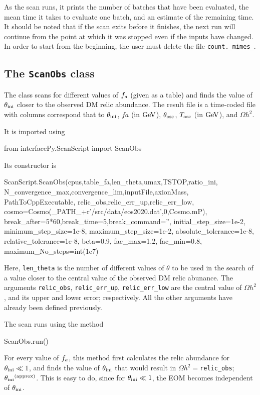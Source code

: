\documentclass[11pt,a4paper]{article}
\begin{document}
As the scan runs, it prints the number of batches that have been evaluated, the mean time it takes to evaluate one batch, and an estimate of the remaining time. It should be noted that if the scan exits before it finishes, the next run will continue from the point at which it was stopped even if the inputs have changed. In order to start from the beginning, the user must delete the file {\tt count.\_mimes\_}.

\subsection{The {\tt ScanObs} class}\label{app:ScanObs}
%
The  class scans for different values of $f_{a}{}$ (given as a table) and finds the value of $\theta_{\rm ini}{}$ closer to the observed DM relic abundance. The result file is a time-coded file with columns correspond that to $\theta_{\rm ini}{}$,  $fa$ (in ${\rm GeV}$), $\theta_{\rm osc}{}$, $T_{\rm osc}{}$ (in ${\rm GeV}$), and $\Omega h^2$. 

It is imported using 
%
\begin{py}
	from interfacePy.ScanScript import ScanObs
\end{py}

Its constructor is
%
\begin{py}
	ScanScript.ScanObs(cpus,table_fa,len_theta,umax,TSTOP,ratio_ini,
					N_convergence_max,convergence_lim,inputFile,axionMass,
					PathToCppExecutable, relic_obs,relic_err_up,relic_err_low,
					cosmo=Cosmo(_PATH_+r'/src/data/eos2020.dat',0,Cosmo.mP),
					break_after=5*60,break_time=5,break_command='',
					initial_step_size=1e-2, minimum_step_size=1e-8, maximum_step_size=1e-2, 
					absolute_tolerance=1e-8, relative_tolerance=1e-8,
					beta=0.9, fac_max=1.2, fac_min=0.8, maximum_No_steps=int(1e7)
\end{py}
%
Here, {\tt len\_theta} is the number of different values of $\theta$ to be used in the search of a value closer to the central value of the observed DM relic abunance. The arguments {\tt relic\_obs}, {\tt relic\_err\_up}, {\tt relic\_err\_low} are the central value of $\Omega h^2$, and its upper and lower error; respectively. All the other arguments have already been defined previously.  

The scan runs using the method
%
\begin{py}
	ScanObs.run()
\end{py} 
%
For every value of $f_{a}{}$, this method first calculates the relic abundance for $\theta_{\rm ini}{} \ll 1$, and finds the value of $\theta_{\rm ini}{}$ that would result in $\Omega h^2 = ${\tt relic\_obs}; $\theta_{\rm ini}{}^{\rm (approx)}$. This is easy to do, since for $\theta_{\rm ini}{} \ll 1$, the EOM becomes independent of $\theta_{\rm ini}{}$. 
\end{document}
